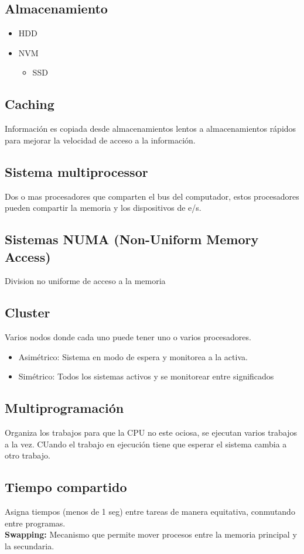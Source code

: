 \documentclass{templateNote}
\begin{document}
\subsection*{Almacenamiento}

\begin{itemize}
    \item HDD
    \item NVM
    \begin{itemize}
        \item SSD
    \end{itemize}
\end{itemize}

\subsection*{Caching}
Información es copiada desde almacenamientos lentos a almacenamientos rápidos para mejorar la velocidad de acceso a la información.

\subsection*{Sistema multiprocessor}
Dos o mas procesadores que comparten el bus del computador, estos procesadores pueden compartir la memoria y los dispositivos de e/s.

\subsection*{Sistemas NUMA (Non-Uniform Memory Access)}
Division no uniforme de acceso a la memoria

\subsection*{Cluster}
Varios nodos donde cada uno puede tener uno o varios procesadores.
\begin{itemize}
    \item Asimétrico: Sistema en modo de espera y monitorea a la activa.
    \item Simétrico: Todos los sistemas activos y se monitorear entre significados
\end{itemize}

\subsection*{Multiprogramación}
Organiza los trabajos para que la CPU no este ociosa, se ejecutan varios trabajos a la vez. CUando el trabajo en ejecución tiene que esperar el sistema cambia a otro trabajo.

\subsection*{Tiempo compartido}
Asigna tiempos (menos de 1 seg) entre tareas de manera equitativa, conmutando entre programas.
\\
\noindent\textbf{Swapping:} Mecanismo que permite mover procesos entre la memoria principal y la secundaria.
\end{document}

